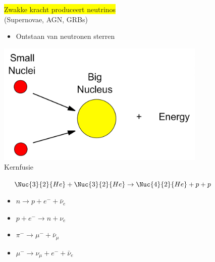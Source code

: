 \vspace{1cm}

\begin{center}
\colorbox{yellow}{Zwakke kracht produceert neutrinos}\\[2mm]
(Supernovae, AGN, GRBs)
\end{center}
%
\begin{itemize}
\item {\blue Ontstaan van neutronen sterren}
\end{itemize}

\newpage
\begin{center}
\includegraphics[keepaspectratio,width=10cm]{nuclear-fusion}\\[2mm]
{\blue Kernfusie}
\end{center}
%
$\quad \Nuc{3}{2}{He}+\Nuc{3}{2}{He} \rightarrow \Nuc{4}{2}{He}+p+p$

\vspace{1cm}
\begin{itemize}
\item[] $n \rightarrow p+e^{-}+\bar{\nu}_{e}$
\item[] {\blue $p+e^{-} \rightarrow n+\nu_{e}$}
\item[] $\pi^{-} \rightarrow \mu^{-}+\bar{\nu}_{\mu}$
\item[] $\mu^{-} \rightarrow \nu_{\mu}+e^{-}+\bar{\nu}_{e}$
\end{itemize}

